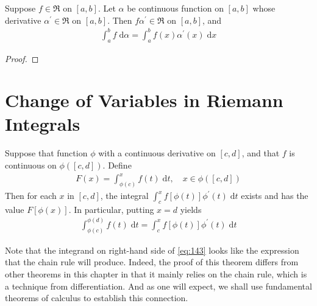 \documentclass[thmcnt=section, 12pt]{my-elegantbook}
\begin{document}
\begin{theorem} \label{thm:91}
	Suppose $f \in \mathfrak{R}$ on $[a, b]$.
	Let $\alpha$ be continuous function on $[a, b]$
	whose derivative $\alpha^\prime \in \mathfrak{R}$ on $[a, b]$.
	Then $f \alpha^\prime \in \mathfrak{R}$ on $[a, b]$, and 
	\begin{align*}
		\int_a^b f \; \mathrm{d} \alpha
		= \int_a^b f(x) \alpha^\prime(x) \; \mathrm{d} x
	\end{align*}
\end{theorem}

\begin{proof}
\end{proof}


\section{Change of Variables in Riemann Integrals}


\begin{theorem} \label{thm:83}
	Suppose that function $\phi$
	with a continuous derivative on $[c, d]$,
	and that $f$ is continuous on $\phi([c, d])$.
	Define 
	\begin{align*}
		F(x) = \int_{\phi(c)}^x f(t) \; \mathrm{d} t,
		\quad x \in \phi([c, d])
	\end{align*}
	Then for each $x$ in $[c, d]$, the integral
	$\int_{c}^x f[\phi(t)] \phi^\prime(t) \; \mathrm{d} t$
	exists and has the value $F[ \phi(x) ]$.
	In particular, putting $x = d$ yields
	\begin{align}
		\int_{\phi(c)}^{\phi(d)} f(t) \; \mathrm{d} t
		= \int_{c}^x f[\phi(t)] \phi^\prime(t) \; \mathrm{d} t
		\label{eq:143}
	\end{align}
\end{theorem}

Note that the integrand on right-hand side of \eqref{eq:143}
looks like the expression that the chain rule will produce.
Indeed, the proof of this theorem
differs from other theorems in this chapter in that 
it mainly relies on the chain rule, 
which is a technique from differentiation. 
And as one will expect, 
we shall use fundamental theorems of calculus
to establish this connection.
\end{document}
